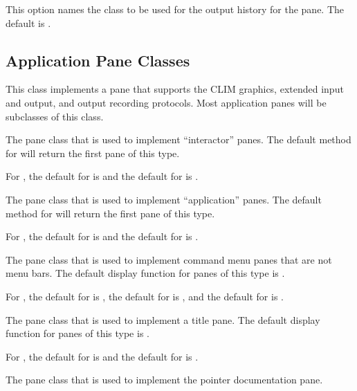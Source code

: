 This option names the class to be used for the output history for the pane.  The
default is .


\subsection {Application Pane Classes}


This class implements a pane that supports the CLIM graphics, extended input and
output, and output recording protocols.  Most application panes will be
subclasses of this class.


The pane class that is used to implement ``interactor'' panes.  The default
method for  will return the first pane of this type.

For , the default for  is  and the
default for  is .


The pane class that is used to implement ``application'' panes.  The default
method for  will return the first pane of this type.

For , the default for  is
 and the default for  is .


The pane class that is used to implement command menu panes that are not menu
bars.  The default display function for panes of this type is
.

For , the default for  is
, the default for  is , and
the default for  is .


The pane class that is used to implement a title pane.  The default display
function for panes of this type is .

For , the default for  is  and the
default for  is .


The pane class that is used to implement the pointer documentation pane.

